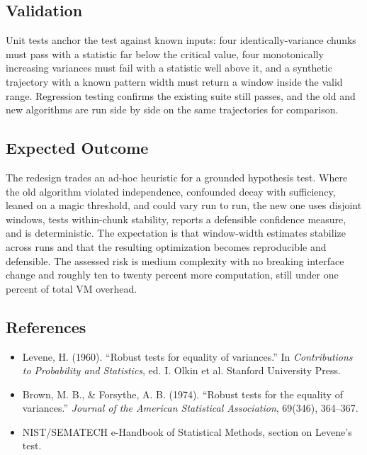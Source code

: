 \subsection{Validation}

Unit tests anchor the test against known inputs: four identically-variance chunks
must pass with a statistic far below the critical value, four monotonically
increasing variances must fail with a statistic well above it, and a synthetic
trajectory with a known pattern width must return a window inside the valid
range. Regression testing confirms the existing suite still passes, and the old
and new algorithms are run side by side on the same trajectories for comparison.

\subsection{Expected Outcome}

The redesign trades an ad-hoc heuristic for a grounded hypothesis test. Where the
old algorithm violated independence, confounded decay with sufficiency, leaned on
a magic threshold, and could vary run to run, the new one uses disjoint windows,
tests within-chunk stability, reports a defensible confidence measure, and is
deterministic. The expectation is that window-width estimates stabilize across
runs and that the resulting optimization becomes reproducible and defensible. The
assessed risk is medium complexity with no breaking interface change and roughly
ten to twenty percent more computation, still under one percent of total VM
overhead.

\subsection{References}

\begin{itemize}
  \item Levene, H. (1960). ``Robust tests for equality of variances.'' In
        \textit{Contributions to Probability and Statistics}, ed. I. Olkin et
        al. Stanford University Press.
  \item Brown, M. B., \& Forsythe, A. B. (1974). ``Robust tests for the equality
        of variances.'' \textit{Journal of the American Statistical
        Association}, 69(346), 364--367.
  \item NIST/SEMATECH e-Handbook of Statistical Methods, section on Levene's
        test.
\end{itemize}
